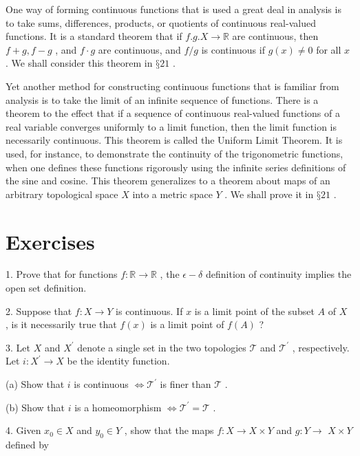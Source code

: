 One way of forming continuous functions that is used a great deal in analysis is to take sums, differences, products, or quotients of continuous real-valued functions. It is a standard theorem that if \(f.g.X \rightarrow  \mathbb{R}\) are continuous, then \(f + g,f - g\) , and \(f \cdot  g\) are continuous, and \(f/g\) is continuous if \(g\left( x\right)  \neq  0\) for all \(x\) . We shall consider this theorem in \(§{21}\) .

Yet another method for constructing continuous functions that is familiar from analysis is to take the limit of an infinite sequence of functions. There is a theorem to the effect that if a sequence of continuous real-valued functions of a real variable converges uniformly to a limit function, then the limit function is necessarily continuous. This theorem is called the Uniform Limit Theorem. It is used, for instance, to demonstrate the continuity of the trigonometric functions, when one defines these functions rigorously using the infinite series definitions of the sine and cosine. This theorem generalizes to a theorem about maps of an arbitrary topological space \(X\) into a metric space \(Y\) . We shall prove it in \(§{21}\) .

\section*{Exercises}

1. Prove that for functions \(f : \mathbb{R} \rightarrow  \mathbb{R}\) , the \(\epsilon  - \delta\) definition of continuity implies the open set definition.

2. Suppose that \(f : X \rightarrow  Y\) is continuous. If \(x\) is a limit point of the subset \(A\) of \(X\) , is it necessarily true that \(f\left( x\right)\) is a limit point of \(f\left( A\right)\) ?

3. Let \(X\) and \({X}^{\prime }\) denote a single set in the two topologies \(\mathcal{T}\) and \({\mathcal{T}}^{\prime }\) , respectively. Let \(i : {X}^{\prime } \rightarrow  X\) be the identity function.

(a) Show that \(i\) is continuous \(\Leftrightarrow  {\mathcal{T}}^{\prime }\) is finer than \(\mathcal{T}\) .

(b) Show that \(i\) is a homeomorphism \(\Leftrightarrow  {\mathcal{T}}^{\prime } = \mathcal{T}\) .

4. Given \({x}_{0} \in  X\) and \({y}_{0} \in  Y\) , show that the maps \(f : X \rightarrow  X \times  Y\) and \(g : Y \rightarrow\)  \(X \times  Y\) defined by

